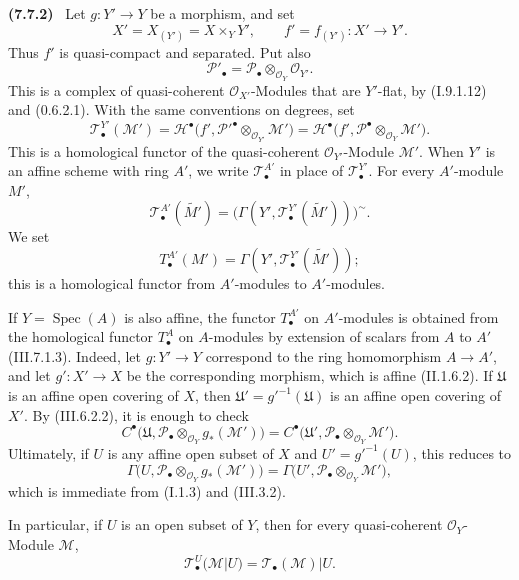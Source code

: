 \documentclass[10pt,oneside]{book}
\newcommand{\sh}[1]{\mathscr{#1}}
\newcommand{\Spec}{\operatorname{Spec}}
\newcommand{\sref}[2][]{(#2)}
\newenvironment{env}[1][]{\par\medskip\noindent\textbf{(#1)}\ }{\par}
\begin{document}
\begin{env}[7.7.2]
\label{III.7.7.2}
Let $g:Y'\to Y$ be a morphism, and set
\[
  X'=X_{(Y')}=X\times_Y Y',
  \qquad
  f'=f_{(Y')}:X'\longrightarrow Y'.
\]
Thus $f'$ is quasi-compact and separated.  Put also
\[
  \sh{P}'_\bullet
  =\sh{P}_\bullet\otimes_{\sh{O}_Y}\sh{O}_{Y'}.
\]
This is a complex of quasi-coherent $\sh{O}_{X'}$-Modules
that are $Y'$-flat, by \sref[I]{I.9.1.12} and
\sref[0]{0.6.2.1}.  With the same conventions on degrees, set
\[
  \sh{T}^{Y'}_\bullet(\sh{M}')
  =
  \mathscr{H}^\bullet
    \bigl(f',
      \sh{P}'^\bullet\otimes_{\sh{O}_{Y'}}\sh{M}'\bigr)
  =
  \mathscr{H}^\bullet
    \bigl(f',
      \sh{P}^\bullet\otimes_{\sh{O}_Y}\sh{M}'\bigr).
  \tag{7.7.2.1}\label{III.7.7.2.1}
\]
This is a homological functor of the quasi-coherent
$\sh{O}_{Y'}$-Module $\sh{M}'$.  When $Y'$ is an affine
scheme with ring $A'$, we write $\sh{T}^{A'}_\bullet$ in
place of $\sh{T}^{Y'}_\bullet$.  For every $A'$-module $M'$,
\[
  \sh{T}^{A'}_\bullet(\widetilde{M'})
  =
  \bigl(
    \Gamma(Y',
      \sh{T}^{Y'}_\bullet(\widetilde{M'}))
  \bigr)^\sim.
\]
We set
\[
  T^{A'}_\bullet(M')
  =
  \Gamma(Y',
    \sh{T}^{Y'}_\bullet(\widetilde{M'}));
\]
this is a homological functor from $A'$-modules to
$A'$-modules.

If $Y=\Spec(A)$ is also affine, the functor
$T^{A'}_\bullet$ on $A'$-modules is obtained from the
homological functor $T^A_\bullet$ on $A$-modules by extension
of scalars from $A$ to $A'$ \sref{III.7.1.3}.  Indeed, let
$g:Y'\to Y$ correspond to the ring homomorphism $A\to A'$,
and let $g':X'\to X$ be the corresponding morphism, which is
affine \sref[II]{II.1.6.2}.  If $\mathfrak U$ is an affine
open covering of $X$, then
$\mathfrak U'=g'^{-1}(\mathfrak U)$ is an affine open
covering of $X'$.  By \sref{III.6.2.2}, it is enough to check
\[
  C^\bullet
  \bigl(\mathfrak U,
    \sh{P}_\bullet\otimes_{\sh{O}_Y}g_*(\sh{M}')\bigr)
  =
  C^\bullet
  \bigl(\mathfrak U',
    \sh{P}_\bullet\otimes_{\sh{O}_Y}\sh{M}'\bigr).
\]
Ultimately, if $U$ is any affine open subset of $X$ and
$U'=g'^{-1}(U)$, this reduces to
\[
  \Gamma
  \bigl(U,
    \sh{P}_\bullet\otimes_{\sh{O}_Y}g_*(\sh{M}')\bigr)
  =
  \Gamma
  \bigl(U',
    \sh{P}_\bullet\otimes_{\sh{O}_Y}\sh{M}'\bigr),
\]
which is immediate from \sref[I]{I.1.3} and \sref{III.3.2}.

In particular, if $U$ is an open subset of $Y$, then for
every quasi-coherent $\sh{O}_Y$-Module $\sh{M}$,
\[
  \sh{T}^U_\bullet(\sh{M}|U)
  =
  \sh{T}_\bullet(\sh{M})|U.
  \tag{7.7.2.2}\label{III.7.7.2.2}
\]
\end{env}
\end{document}
